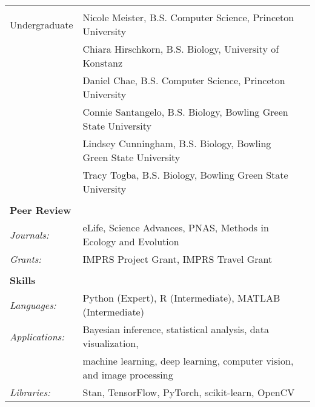 \documentclass[letterpaper,6pt,oneside]{article}
\begin{document}
\begin{small}
\begin{longtable}{@{} l p{5.3in}l}
 & \\
 \large{Undergraduate}
 & Nicole Meister, B.S. Computer Science, Princeton University \\
  & Chiara Hirschkorn, B.S. Biology, University of Konstanz \\
  & Daniel Chae, B.S. Computer Science, Princeton University \\
 &  Connie Santangelo, B.S. Biology, Bowling Green State University \\
 & Lindsey Cunningham, B.S. Biology, Bowling Green State University \\
 & Tracy Togba, B.S. Biology, Bowling Green State University \\
& \\

 \Large{\textbf{Peer Review}}  \vspace{5mm} \\
 \normalsize{\textit{Journals: }} & eLife, Science Advances, PNAS, Methods in Ecology and Evolution \vspace{1mm} \\
 \normalsize{\textit{Grants: }} & IMPRS Project Grant, IMPRS Travel Grant \vspace{1mm} \\
 & \\

\Large{\textbf{Skills}} \vspace{5mm} \\
\normalsize{\textit{Languages: }}
& Python (Expert), R (Intermediate), MATLAB (Intermediate) \vspace{1mm}\\ %
\normalsize{\textit{Applications: }} 
& Bayesian inference, statistical analysis, data visualization, \\ 
& machine learning, deep learning, computer vision, and image processing \vspace{1mm}\\
\normalsize{\textit{Libraries: }}
& Stan, TensorFlow, PyTorch, scikit-learn, OpenCV \\
\end{longtable}
\end{small}
\end{document}
